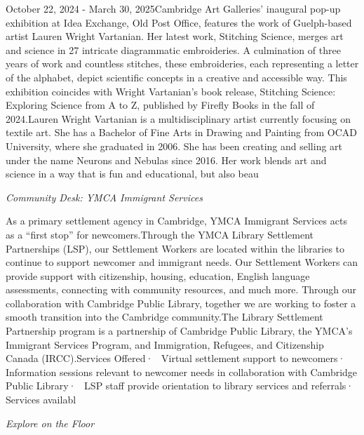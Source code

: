 \documentclass[letterpaper, 10pt]{article}
\newcommand{\subtitle}[1]{\textit{\large #1}\vspace{0.5em}}
\newcommand{\articlecontent}[1]{\small #1\vspace{1em}}
\begin{document}
\begin{multicols}{2}
{October 22, 2024 - March 30, 2025Cambridge Art Galleries' inaugural pop-up exhibition at Idea Exchange, Old Post Office, features the work of Guelph-based artist Lauren Wright Vartanian. Her latest work, Stitching Science, merges art and science in 27 intricate diagrammatic embroideries. A culmination of three years of work and countless stitches, these embroideries, each representing a letter of the alphabet, depict scientific concepts in a creative and accessible way. This exhibition coincides with Wright Vartanian’s book release, Stitching Science: Exploring Science from A to Z, published by Firefly Books in the fall of 2024.Lauren Wright Vartanian is a multidisciplinary artist currently focusing on textile art. She has a Bachelor of Fine Arts in Drawing and Painting from OCAD University, where she graduated in 2006. She has been creating and selling art under the name Neurons and Nebulas since 2016. Her work blends art and science in a way that is fun and educational, but also beau
}
\vspace{10px}

\subtitle{Community Desk: YMCA Immigrant Services}

\articlecontent{

\qrcode[height=1.5cm]{https://ideaexchange.libnet.info/event/12494607}
\vspace{10px}

As a primary settlement agency in Cambridge, YMCA Immigrant Services acts as a “first stop” for newcomers.Through the YMCA Library Settlement Partnerships (LSP), our Settlement Workers are located within the libraries to continue to support newcomer and immigrant needs. Our Settlement Workers can provide support with citizenship, housing, education, English language assessments, connecting with community resources, and much more. Through our collaboration with Cambridge Public Library, together we are working to foster a smooth transition into the Cambridge community.The Library Settlement Partnership program is a partnership of Cambridge Public Library, the YMCA’s Immigrant Services Program, and Immigration, Refugees, and Citizenship Canada (IRCC).Services Offered·  Virtual settlement support to newcomers·  Information sessions relevant to newcomer needs in collaboration with Cambridge Public Library·  LSP staff provide orientation to library services and referrals·  Services availabl
}
\vspace{10px}

\subtitle{Explore on the Floor}

\articlecontent{

}
\end{multicols}
\end{document}
